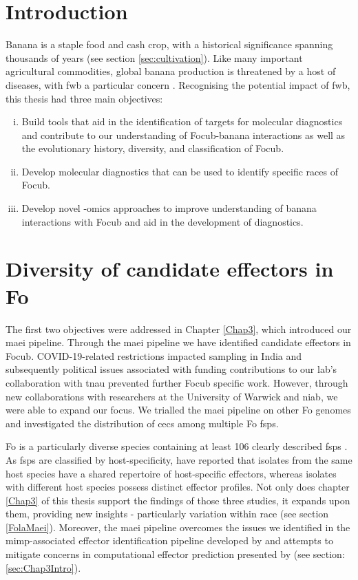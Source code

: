 
\section{Introduction}

Banana is a staple food and cash crop, with a historical significance spanning thousands of years (see section \ref{sec:cultivation}). Like many important agricultural commodities, global banana production is threatened by a host of diseases, with \Acf{fwb} a particular concern \parencite{Ploetz2005}. Recognising the potential impact of \ac{fwb}, this thesis had three main objectives:

\begin{enumerate}[i)]
    \item Build tools that aid in the identification of targets for molecular diagnostics and contribute to our understanding of \acf{Focub}-banana interactions as well as the evolutionary history, diversity, and classification of \ac{Focub}.
    \item Develop molecular diagnostics that can be used to identify specific races of \ac{Focub}. 
    \item Develop novel -omics approaches to improve understanding of banana interactions with \ac{Focub} and aid in the development of diagnostics.
\end{enumerate}

\section{Diversity of candidate effectors in \acl{Fo}}

The first two objectives were addressed in Chapter \ref{Chap3}, which introduced our \acf{maei} pipeline. Through the \ac{maei} pipeline we have identified candidate effectors in \ac{Focub}. COVID-19-related restrictions impacted sampling in India and subsequently political issues associated with funding contributions to our lab's collaboration with \acf{tnau} prevented further \ac{Focub} specific work. However, through new collaborations with researchers at the University of Warwick and \ac{niab}, we were able to expand our focus. We trialled the \ac{maei} pipeline on other \ac{Fo} genomes and investigated the distribution of \acfp{cec} among multiple \acf{Fo} \acfp{fsp}.  

\ac{Fo} is a particularly diverse species containing at least 106 clearly described \acp{fsp} \parencite{Edel-Hermann2019}. As \acp{fsp} are classified by host-specificity, \textcite{Dam2016,Dam2017,FoEC2} have reported that isolates from the same host species have a shared repertoire of host-specific effectors, whereas isolates with different host species possess distinct effector profiles. Not only does chapter \ref{Chap3} of this thesis support the findings of those three studies, it expands upon them, providing new insights - particularly variation within race (see section \ref{FolaMaei}). Moreover, the \ac{maei} pipeline overcomes the issues we identified in the \ac{mimp}-associated effector identification pipeline developed by \textcite{Dam2016} and attempts to mitigate concerns in computational effector prediction presented by \textcite{Sperschneider2015, LoPresti2015, Todd2022} (see section: \ref{sec:Chap3Intro}). 

